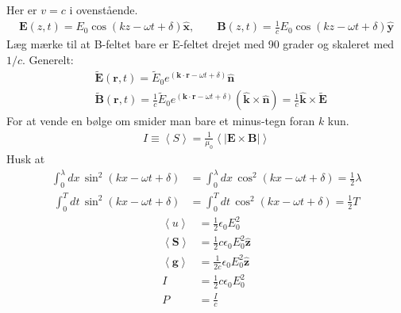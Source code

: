 \documentclass[a4paper]{article}
\begin{document}
    Her er \(v = c\) i ovenstående.  
    \begin{align*}
       \mathbf{E}(z, t) = E_0 \cos (kz - \omega t + \delta ) \hat{\mathbf{x}}, \qquad \mathbf{B}(z, t) = \frac{1}{c} E_0 \cos (kz - \omega t + \delta ) \hat{\mathbf{y}} \tag{9.49}
    \end{align*}
    Læg mærke til at B-feltet bare er E-feltet drejet med 90 grader og skaleret med \(1 / c\). Generelt: \begin{align*}
        &\tilde{\mathbf{E}}(\mathbf{r}, t) =  \tilde{E}_0 e^{(\mathbf{k} \cdot \mathbf{r} - \omega t + \delta )} \hat{\mathbf{n}}\\
        &\tilde{\mathbf{B}}(\mathbf{r}, t) =  \frac{1}{c}\tilde{E}_0 e^{(\mathbf{k} \cdot \mathbf{r} - \omega t + \delta )} \left( \hat{\mathbf{k}} \times \hat{\mathbf{n}} \right) = \frac{1}{c} \hat{\mathbf{k}} \times \tilde{\mathbf{E}} \tag{9.50}
    \end{align*}
    For at vende en bølge om smider man bare et minus-tegn foran \(k\) kun. 
    \begin{align*}
        \boxed{I \equiv \left\langle S \right\rangle = \frac{1}{\mu _0}\left\langle \left| \mathbf{E} \times \mathbf{B} \right|   \right\rangle }\tag{9.64}
    \end{align*}
    Husk at
    \begin{align*}
        \int_0^{\lambda } dx \,\sin^2 (kx - \omega t + \delta )
        &= \int_0^{\lambda } dx \,\cos^2 (kx - \omega t + \delta ) = \frac{1}{2} \lambda
    \end{align*}
    \begin{align*}
        \int_0^{T } dt \,\sin^2 (kx - \omega t + \delta )
        &= \int_0^{T } dt \,\cos^2 (kx - \omega t + \delta ) = \frac{1}{2} T
    \end{align*}
    \begin{align*}
        \left\langle u \right\rangle &= \frac{1}{2} \epsilon _0 E_0^2 \tag{9.61}\\
        \left\langle \mathbf{S} \right\rangle &= \frac{1}{2} c \epsilon _0 E_0 ^2 \hat{\mathbf{z}}\tag{9.62}\\
        \left\langle \mathbf{g} \right\rangle &= \frac{1}{2c} \epsilon _0 E_0 ^2 \hat{\mathbf{z}}\tag{9.63}\\
        I &= \frac{1}{2} c \epsilon _0 E_0^2\tag{9.64}\\
        P &= \frac{I}{c}\tag{9.65}
    \end{align*}
\end{document}
